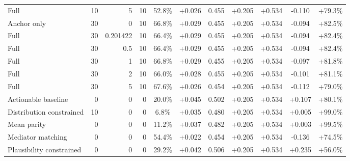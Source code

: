 \begin{table}[htbp]
\begin{tabular}{lrrrccccccc}
Full & 10 & 5 & 10 & 52.8\% & +0.026 & 0.455 & +0.205 & +0.534 & -0.110 & +79.3\% \\
Anchor only & 30 & 0 & 10 & 66.8\% & +0.029 & 0.455 & +0.205 & +0.534 & -0.094 & +82.5\% \\
Full & 30 & 0.201422 & 10 & 66.4\% & +0.029 & 0.455 & +0.205 & +0.534 & -0.094 & +82.4\% \\
Full & 30 & 0.5 & 10 & 66.4\% & +0.029 & 0.455 & +0.205 & +0.534 & -0.094 & +82.4\% \\
Full & 30 & 1 & 10 & 66.8\% & +0.029 & 0.455 & +0.205 & +0.534 & -0.097 & +81.8\% \\
Full & 30 & 2 & 10 & 66.0\% & +0.028 & 0.455 & +0.205 & +0.534 & -0.101 & +81.1\% \\
Full & 30 & 5 & 10 & 67.6\% & +0.026 & 0.454 & +0.205 & +0.534 & -0.112 & +79.0\% \\
Actionable baseline & 0 & 0 & 0 & 20.0\% & +0.045 & 0.502 & +0.205 & +0.534 & +0.107 & +80.1\% \\
Distribution constrained & 10 & 0 & 0 & 6.8\% & +0.035 & 0.480 & +0.205 & +0.534 & +0.005 & +99.0\% \\
Mean parity & 0 & 0 & 0 & 11.2\% & +0.037 & 0.482 & +0.205 & +0.534 & +0.003 & +99.5\% \\
Mediator matching & 0 & 0 & 0 & 54.4\% & +0.022 & 0.454 & +0.205 & +0.534 & -0.136 & +74.5\% \\
Plausibility constrained & 0 & 0 & 0 & 29.2\% & +0.042 & 0.506 & +0.205 & +0.534 & +0.235 & +56.0\% \\
\bottomrule
\end{tabular}
\end{table}